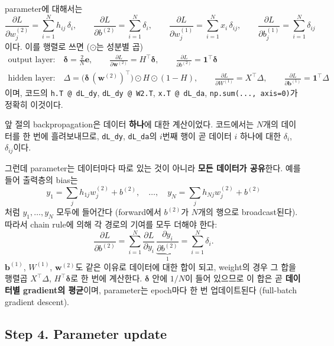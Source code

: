 \documentclass[11pt,a4paper]{article}
\newcommand{\vect}[1]{\bm{#1}}
\begin{document}
parameter에 대해서는
\[
\frac{\partial L}{\partial w^{(2)}_j}=\sum_{i=1}^{N}h_{ij}\,\delta_i,
\qquad
\frac{\partial L}{\partial b^{(2)}}=\sum_{i=1}^{N}\delta_i,
\qquad
\frac{\partial L}{\partial w^{(1)}_j}=\sum_{i=1}^{N}x_i\,\delta_{ij},
\qquad
\frac{\partial L}{\partial b^{(1)}_j}=\sum_{i=1}^{N}\delta_{ij}
\]
이다.
이를 행렬로 쓰면 ($\odot$는 성분별 곱)
\[
\boxed{
\begin{gathered}
\text{output layer:}\quad
\boldsymbol\delta=\tfrac{2}{N}\vect{e},
\qquad
\frac{\partial L}{\partial \vect{w}^{(2)}}=H^{\!\top}\boldsymbol\delta,
\qquad
\frac{\partial L}{\partial b^{(2)}}=\mathbf 1^{\!\top}\boldsymbol\delta
\\[6pt]
\text{hidden layer:}\quad
\Delta=\bigl(\boldsymbol\delta\,(\vect{w}^{(2)})^{\!\top}\bigr)\odot H\odot(1-H),
\qquad
\frac{\partial L}{\partial W^{(1)}}=X^{\!\top}\Delta,
\qquad
\frac{\partial L}{\partial \vect{b}^{(1)}}=\mathbf 1^{\!\top}\Delta
\end{gathered}
}
\]
이며, 코드의 \texttt{h.T @ dL\_dy}, \texttt{dL\_dy @ W2.T}, \texttt{x.T @ dL\_da},
\texttt{np.sum(..., axis=0)}가 정확히 이것이다.

\begin{remarkbox}
앞 절의 backpropagation은 데이터 \textbf{하나}에 대한 계산이었다.
코드에서는 $N$개의 데이터를 한 번에 흘려보내므로,
\texttt{dL\_dy}, \texttt{dL\_da}의 $i$번째 행이 곧 데이터 $i$ 하나에 대한 $\delta_i$, $\delta_{ij}$이다.

그런데 parameter는 데이터마다 따로 있는 것이 아니라
\textbf{모든 데이터가 공유}한다. 예를 들어 출력층의 bias는
\[
y_1=\textstyle\sum_j h_{1j}w^{(2)}_j+b^{(2)},\quad
\ldots,\quad
y_N=\sum_j h_{Nj}w^{(2)}_j+b^{(2)}
\]
처럼 $y_1,\ldots,y_N$ 모두에 들어간다
(forward에서 $b^{(2)}$가 $N$개의 행으로 broadcast된다).
따라서 chain rule에 의해 각 경로의 기여를 모두 더해야 한다:
\[
\frac{\partial L}{\partial b^{(2)}}
=
\sum_{i=1}^{N}
\frac{\partial L}{\partial y_i}\,
\underbrace{\frac{\partial y_i}{\partial b^{(2)}}}_{1}
=
\sum_{i=1}^{N}\delta_i .
\]
$\vect{b}^{(1)}$, $W^{(1)}$, $\vect{w}^{(2)}$도 같은 이유로 데이터에 대한 합이 되고,
weight의 경우 그 합을 행렬곱 $X^{\!\top}\Delta$, $H^{\!\top}\boldsymbol\delta$로 한 번에 계산한다.
$\boldsymbol\delta$ 안에 $1/N$이 들어 있으므로 이 합은 곧
\textbf{데이터별 gradient의 평균}이며,
parameter는 epoch마다 한 번 업데이트된다 (full-batch gradient descent).
\end{remarkbox}

\subsection{Step 4. Parameter update}
\end{document}
